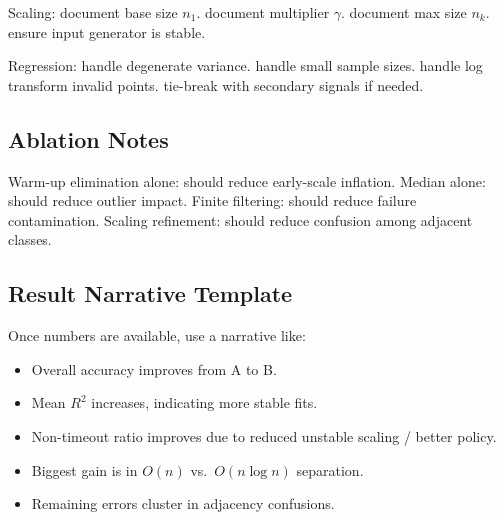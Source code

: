\documentclass[conference]{IEEEtran}
\begin{document}
Scaling:
document base size $n_1$.
document multiplier $\gamma$.
document max size $n_k$.
ensure input generator is stable.

Regression:
handle degenerate variance.
handle small sample sizes.
handle log transform invalid points.
tie-break with secondary signals if needed.

\subsection{Ablation Notes}
Warm-up elimination alone:
should reduce early-scale inflation.
Median alone:
should reduce outlier impact.
Finite filtering:
should reduce failure contamination.
Scaling refinement:
should reduce confusion among adjacent classes.

\subsection{Result Narrative Template}
Once numbers are available, use a narrative like:
\begin{itemize}[leftmargin=1.2em]
\item Overall accuracy improves from A to B.
\item Mean $R^2$ increases, indicating more stable fits.
\item Non-timeout ratio improves due to reduced unstable scaling / better policy.
\item Biggest gain is in $O(n)$ vs.\ $O(n\log n)$ separation.
\item Remaining errors cluster in adjacency confusions.
\end{itemize}

\end{document}
